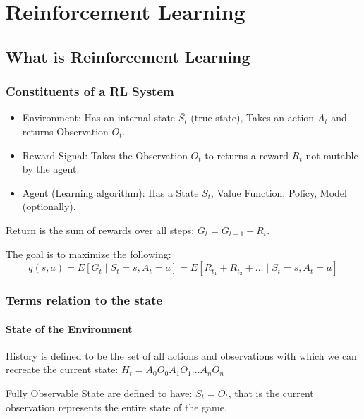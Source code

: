 \chapter{Reinforcement Learning}



\section{What is Reinforcement Learning}


\subsection{Constituents of a RL System}

\begin{itemize}
    \item Environment:
          Has an internal state $\bar{S_t}$ (true state), Takes an action $A_t$ and returns Observation $O_t$.
    \item Reward Signal:
          Takes the Observation $O_t$ to returns a reward $R_t$ not mutable by the agent.
    \item Agent (Learning algorithm):
          Has a State $S_t$, Value Function, Policy, Model (optionally).
\end{itemize}

Return is the sum of rewards over all steps: $G_t = G_{t − 1} + R_t$.

The goal is to maximize the following:
\begin{equation}
    q(s, a) = E[G_t ∣ S_t = s, A_t = a] = E[R_{t_1} + R_{t_2} + \dots ∣ S_t = s, A_t = a]
\end{equation}


\subsection{Terms relation to the state}

\subsubsection{State of the Environment}

History is defined to be the set of all actions and observations with which we can recreate the current state: $ H_t = A_0 O_0 A_1 O_1 \dots A_n O_n $

Fully Observable State are defined to have: $S_t = O_t$, that is the current observation represents the entire state of the game.

